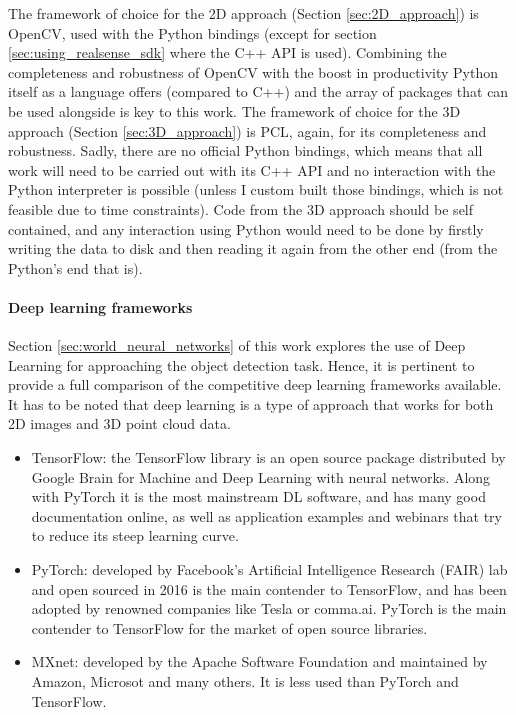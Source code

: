 \documentclass[../main.tex]{subfiles}
\begin{document}
The framework of choice for the 2D approach (Section \ref{sec:2D_approach}) is OpenCV, used with the Python bindings (except for section \ref{sec:using_realsense_sdk} where the C++ API is used). Combining the completeness and robustness of OpenCV with the boost in productivity Python itself as a language offers (compared to C++) and the array of packages that can be used alongside is key to this work. The framework of choice for the 3D approach (Section \ref{sec:3D_approach}) is PCL, again, for its completeness and robustness. Sadly, there are no official Python bindings, which means that all work will need to be carried out with its C++ API and no interaction with the Python interpreter is possible (unless I custom built those bindings, which is not feasible due to time constraints). Code from the 3D approach should be self contained, and any interaction using Python would need to be done by firstly writing the data to disk and then reading it again from the other end (from the Python's end that is).

\paragraph{Deep learning frameworks}
Section \ref{sec:world_neural_networks} of this work explores the use of Deep Learning for approaching the object detection task. Hence, it is pertinent to provide a full comparison of the competitive deep learning frameworks available. It has to be noted that deep learning is a type of approach that works for both 2D images and 3D point cloud data.

\begin{itemize}
    \item TensorFlow: the TensorFlow \cite{tensorflow2015-whitepaper} library is an open source package distributed by Google Brain for Machine and Deep Learning with neural networks. Along with PyTorch it is the most mainstream DL software, and has many good documentation online, as well as application examples and webinars that try to reduce its steep learning curve.
    \item PyTorch: developed by Facebook's Artificial Intelligence Research (FAIR) lab and open sourced in 2016 is the main contender to TensorFlow, and has been adopted by renowned companies like Tesla or comma.ai. PyTorch \cite{pytorch-whitepaper} is the main contender to TensorFlow for the market of open source libraries.
    \item MXnet: developed by the Apache Software Foundation \cite{mxnet-whitepaper} and maintained by Amazon, Microsot and many others. It is less used than PyTorch and TensorFlow.
\end{itemize}
\end{document}
